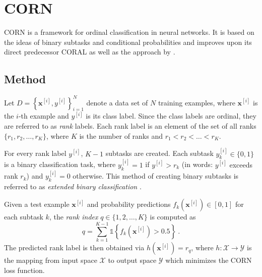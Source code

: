 \section{CORN} \label{sec:ordinal:corn}
\acf{CORN} \cite{corn}
is a framework for ordinal classification in neural networks.
It is based on the ideas of binary subtasks and conditional probabilities
and improves upon
  its direct predecessor \ac{CORAL} \cite{coral}
  as well as the approach by \citeauthor{extended_binary_nn} \cite{extended_binary_nn}.
%
%
%


\subsection{Method} \label{sec:corn:method}
%
Let $D = \left\{ \mathbf{x}^{[i]}, y^{[i]} \right\}_{i=1}^N$ denote a data set of $N$ training examples,
where $\mathbf{x}^{[i]}$ is the $i$-th example and $y^{[i]}$ is its class label.
Since the class labels are ordinal, they are referred to as \emph{rank} labels.
Each rank label is an element of the set of all ranks $\{r_1, r_2, \ldots, r_K\}$,
  where
  $K$ is the number of ranks
  and $r_1 < r_2 < \ldots < r_K$.

For every rank label $y^{[i]}$,
$K - 1$ subtasks are created.
Each subtask $y^{[i]}_k \in \{0, 1\}$ is a binary classification task,
  where
    $y^{[i]}_k = 1$ if $y^{[i]} > r_k$ (in words: {$y^{[i]}$ exceeds rank $r_k$})
    and $y^{[i]}_k = 0$ otherwise.
This method of creating binary subtasks is referred to as \emph{extended binary classification} \cite{extended_binary}.

Given a test example $\mathbf{x}^{[i]}$
and probability predictions $f_k(\mathbf{x}^{[i]}) \in [0,1]$ for each subtask $k$,
the \emph{rank index} $q \in \{1, 2, \ldots, K\}$ is computed as
\begin{equation}
  q = \sum_{k=1}^{K-1} \mathbb{1}\left\{f_k(\mathbf{x}^{[i]}) > 0.5\right\} \ .
\end{equation}
The predicted rank label is then obtained via
$h(\mathbf{x}^{[i]}) = r_q$,
where $h: \mathcal{X} \to \mathcal{Y}$ is the mapping from input space $\mathcal{X}$ to output space $\mathcal{Y}$ %
which minimizes the CORN loss function.


